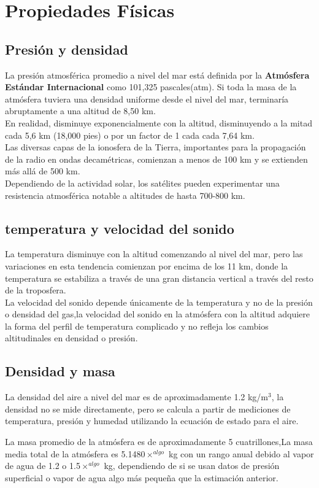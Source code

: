 \documentclass{article}
\begin{document}
\section{Propiedades Físicas}
\subsection{Presión y densidad}
La presión atmosférica promedio a nivel del mar está definida por la \textbf{Atmósfera Estándar Internacional} como 101,325 pascales(atm).
Si toda la masa de la atmósfera tuviera una densidad uniforme desde el nivel del mar, terminaría abruptamente a una altitud de 8,50 km. \\
En realidad, disminuye exponencialmente con la altitud, disminuyendo a la mitad cada 5,6 km (18,000 pies) o por un factor de 1 cada cada 7,64 km.\\
Las diversas capas de la ionosfera de la Tierra, importantes para la propagación de la radio en ondas decamétricas, comienzan a menos de 100 km y se extienden más allá de 500 km.\\ Dependiendo de la actividad solar, los satélites pueden experimentar una resistencia atmosférica notable a altitudes de hasta 700-800 km.

\subsection{temperatura y velocidad del sonido}
La temperatura disminuye con la altitud comenzando al nivel del mar, pero las variaciones en esta tendencia comienzan por encima de los 11 km, donde la temperatura se estabiliza a través de una gran distancia vertical a través del resto de la troposfera.\\
La velocidad del sonido depende únicamente de la temperatura y no de la presión o densidad del gas,la velocidad del sonido en la atmósfera con la altitud adquiere la forma del perfil de temperatura complicado  y no refleja los cambios altitudinales en densidad o presión.
\subsection{Densidad y masa}
La densidad del aire a nivel del mar es de aproximadamente 1.2 kg/m$^{3}$, la densidad no se mide directamente, pero se calcula a partir de mediciones de temperatura, presión y humedad utilizando la ecuación de estado para el aire.

La masa promedio de la atmósfera es de aproximadamente 5 cuatrillones,La masa media total de la atmósfera es 5.1480$\times ^{algo}$ kg con un rango anual debido al vapor de agua de 1.2 o 1.5$\times ^{algo}$ kg, dependiendo de si se usan datos de presión superficial o vapor de agua algo más pequeña que la estimación anterior.
\end{document}
